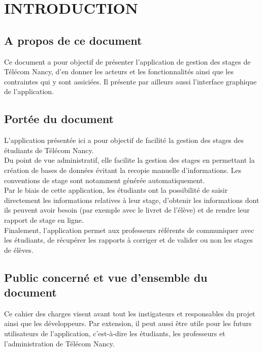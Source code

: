 \documentclass{scrreprt}
\begin{document}
\chapter{INTRODUCTION}

\section{A propos de ce document}
\hspace{1cm}Ce document a pour objectif de présenter l'application de gestion des stages de Télécom Nancy, d'en donner les acteurs et les fonctionnalités ainsi que les contraintes qui y sont assiciées. Il présente par ailleurs aussi l'interface graphique de l'application.

\section{Portée du document}
\hspace{1cm}L'application présentée ici a pour objectif de facilité la gestion des stages des étudiants de Télécom Nancy.\\

\hspace{0.7cm}Du point de vue administratif, elle facilite la gestion des stages en permettant la création de bases de données évitant la recopie manuelle d'informations. Les conventions de stage sont notamment générée automatiquement.\\

\hspace{0.7cm}Par le biais de cette application, les étudiants ont la possibilité de saisir directement les informations relatives à leur stage, d'obtenir les informations dont ils peuvent avoir besoin (par exemple avec le livret de l'élève) et de rendre leur rapport de stage en ligne.\\

\hspace{0.7cm}Finalement, l'application permet aux professeurs référents de communiquer avec les étudiants, de récupérer les rapports à corriger et de valider ou non les stages de élèves.

\section{Public concerné et vue d'ensemble du document }

\hspace{1cm}Ce cahier des charges visent avant tout les instigateurs et responsables du projet ainsi que les développeurs. Par extension, il peut aussi être utile pour les futurs utilisateurs de l'application, c'est-à-dire les étudiants, les professeurs et l'administration de Télécom Nancy.\\
\end{document}
